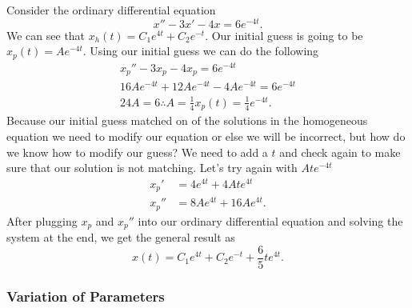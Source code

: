 \begin{eg}
  Consider the ordinary differential equation
  \[
  x''-3x'-4x=6e^{-4t}
  .\] 
  We can see that $x_h(t)=C_1e^{4t}+C_2e^{-t} $. Our initial guess is going to be $x_p(t)=Ae^{-4t}$. Using our initial guess we can do the following 
  \begin{align*}
    x_p''-3x_p-4x_p=6e^{-4t}\\
    16Ae^{-4t}+12Ae^{-4t}-4Ae^{-4t}=6e^{-4t}\\
    24A=6\therefore A=\frac{1}{4}
    x_p(t)=\frac{1}{4}e^{-4t}
  .\end{align*}
  Because our initial guess matched on of the solutions in the homogeneous equation we need to modify our equation or else we will be incorrect, but how do we know how to modify our guess? We need to add a $t$ and check again to make sure that our solution is not matching. Let's try again with $Ate^{-4t}$
  \begin{align*}
    x_p'&=4e^{4t}+4Ate^{4t}\\
    x_p''&=8Ae^{4t}+16Ae^{4t}
  .\end{align*}
  After plugging $x_p$ and $x_p''$ into our ordinary differential equation and solving the system at the end, we get the general result as
  \[
    x(t)=C_1e^{4t}+C_2e^{-t}+\frac{6}{5}te^{4t}
  .\] 
\end{eg}

\subsubsection{Variation of Parameters}

